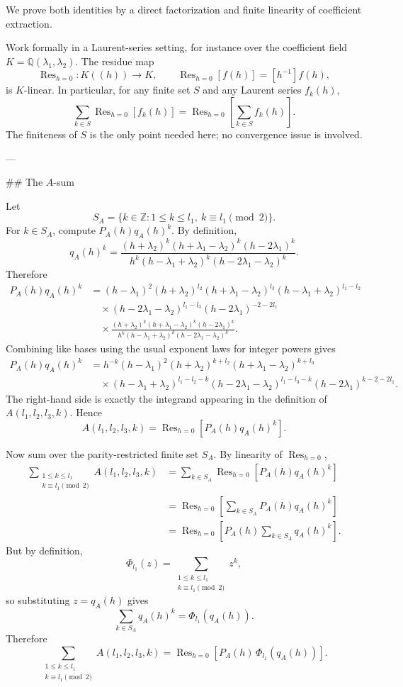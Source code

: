 We prove both identities by a direct factorization and finite linearity of coefficient extraction.

Work formally in a Laurent-series setting, for instance over the coefficient field \(K=\mathbb{Q}(\lambda_1,\lambda_2)\). The residue map
\[
\operatorname{Res}_{h=0}:K((h))\to K,\qquad \operatorname{Res}_{h=0}[f(h)]=[h^{-1}]f(h),
\]
is \(K\)-linear. In particular, for any finite set \(S\) and any Laurent series \(f_k(h)\),
\[
\sum_{k\in S}\operatorname{Res}_{h=0}[f_k(h)]
=
\operatorname{Res}_{h=0}\!\left[\sum_{k\in S} f_k(h)\right].
\]
The finiteness of \(S\) is the only point needed here; no convergence issue is involved.

---

## The \(A\)-sum

Let
\[
S_A=\{k\in\mathbb{Z}:1\le k\le l_1,\ k\equiv l_1\pmod 2\}.
\]
For \(k\in S_A\), compute \(P_A(h)q_A(h)^k\). By definition,
\[
q_A(h)^k
=
\frac{(h+\lambda_2)^k(h+\lambda_1-\lambda_2)^k(h-2\lambda_1)^k}
{h^k(h-\lambda_1+\lambda_2)^k(h-2\lambda_1-\lambda_2)^k}.
\]
Therefore
\begin{align*}
P_A(h)q_A(h)^k
&=
(h-\lambda_1)^2
(h+\lambda_2)^{l_2}
(h+\lambda_1-\lambda_2)^{l_3}
(h-\lambda_1+\lambda_2)^{l_1-l_2} \\
&\quad\times
(h-2\lambda_1-\lambda_2)^{l_1-l_3}
(h-2\lambda_1)^{-2-2l_1} \\
&\quad\times
\frac{(h+\lambda_2)^k(h+\lambda_1-\lambda_2)^k(h-2\lambda_1)^k}
{h^k(h-\lambda_1+\lambda_2)^k(h-2\lambda_1-\lambda_2)^k}.
\end{align*}
Combining like bases using the usual exponent laws for integer powers gives
\begin{align*}
P_A(h)q_A(h)^k
&=
h^{-k}(h-\lambda_1)^2
(h+\lambda_2)^{k+l_2}
(h+\lambda_1-\lambda_2)^{k+l_3} \\
&\quad\times
(h-\lambda_1+\lambda_2)^{l_1-l_2-k}
(h-2\lambda_1-\lambda_2)^{l_1-l_3-k}
(h-2\lambda_1)^{k-2-2l_1}.
\end{align*}
The right-hand side is exactly the integrand appearing in the definition of \(A(l_1,l_2,l_3,k)\). Hence
\[
A(l_1,l_2,l_3,k)
=
\operatorname{Res}_{h=0}\!\left[P_A(h)q_A(h)^k\right].
\]

Now sum over the parity-restricted finite set \(S_A\). By linearity of \(\operatorname{Res}_{h=0}\),
\begin{align*}
\sum_{\substack{1\le k\le l_1\\ k\equiv l_1\pmod 2}}
A(l_1,l_2,l_3,k)
&=
\sum_{k\in S_A}
\operatorname{Res}_{h=0}\!\left[P_A(h)q_A(h)^k\right] \\
&=
\operatorname{Res}_{h=0}\!\left[
\sum_{k\in S_A} P_A(h)q_A(h)^k
\right] \\
&=
\operatorname{Res}_{h=0}\!\left[
P_A(h)\sum_{k\in S_A}q_A(h)^k
\right].
\end{align*}
But by definition,
\[
\Phi_{l_1}(z)
=
\sum_{\substack{1\le k\le l_1\\ k\equiv l_1\pmod 2}} z^k,
\]
so substituting \(z=q_A(h)\) gives
\[
\sum_{k\in S_A}q_A(h)^k
=
\Phi_{l_1}(q_A(h)).
\]
Therefore
\[
\boxed{
\sum_{\substack{1\le k\le l_1\\ k\equiv l_1\pmod2}} A(l_1,l_2,l_3,k)
=
\operatorname{Res}_{h=0}\!\left[P_A(h)\,\Phi_{l_1}(q_A(h))\right].
}
\]

